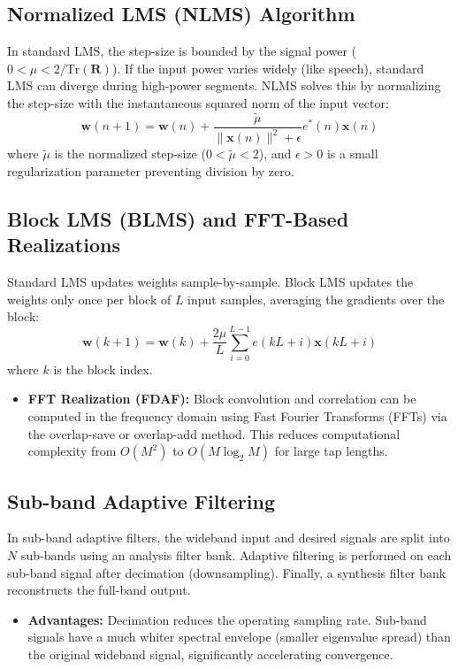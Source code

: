 \documentclass[12pt,a4paper]{article}
\begin{document}
\subsection{Normalized LMS (NLMS) Algorithm}
In standard LMS, the step-size is bounded by the signal power ($0 < \mu < 2/\text{Tr}(\mathbf{R})$). If the input power varies widely (like speech), standard LMS can diverge during high-power segments. NLMS solves this by normalizing the step-size with the instantaneous squared norm of the input vector:
\begin{equation}
  \mathbf{w}(n+1) = \mathbf{w}(n) + \frac{\tilde{\mu}}{\|\mathbf{x}(n)\|^2 + \epsilon} e^*(n) \mathbf{x}(n)
\end{equation}
where $\tilde{\mu}$ is the normalized step-size ($0 < \tilde{\mu} < 2$), and $\epsilon > 0$ is a small regularization parameter preventing division by zero.

\subsection{Block LMS (BLMS) and FFT-Based Realizations}
Standard LMS updates weights sample-by-sample. Block LMS updates the weights only once per block of $L$ input samples, averaging the gradients over the block:
\begin{equation}
  \mathbf{w}(k+1) = \mathbf{w}(k) + \frac{2\mu}{L} \sum_{i=0}^{L-1} e(kL + i) \mathbf{x}(kL + i)
\end{equation}
where $k$ is the block index.
\begin{itemize}[leftmargin=*, itemsep=2pt]
  \item \textbf{FFT Realization (FDAF):} Block convolution and correlation can be computed in the frequency domain using Fast Fourier Transforms (FFTs) via the overlap-save or overlap-add method. This reduces computational complexity from $O(M^2)$ to $O(M \log_2 M)$ for large tap lengths.
\end{itemize}

\subsection{Sub-band Adaptive Filtering}
In sub-band adaptive filters, the wideband input and desired signals are split into $N$ sub-bands using an analysis filter bank. Adaptive filtering is performed on each sub-band signal after decimation (downsampling). Finally, a synthesis filter bank reconstructs the full-band output.
\begin{itemize}[leftmargin=*, itemsep=2pt]
  \item \textbf{Advantages:} Decimation reduces the operating sampling rate. Sub-band signals have a much whiter spectral envelope (smaller eigenvalue spread) than the original wideband signal, significantly accelerating convergence.
\end{itemize}
\end{document}
